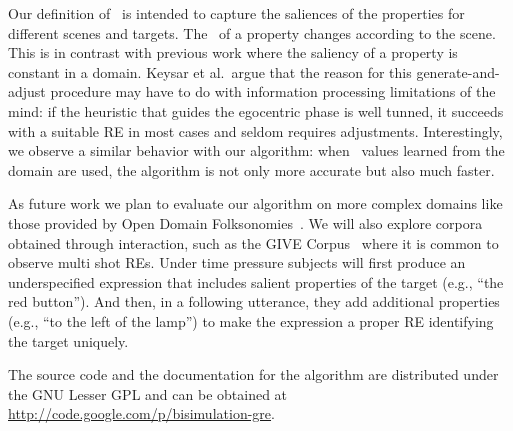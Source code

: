 Our definition of \puse\ is intended to capture the saliences of the properties for different scenes and targets. The \puse\ of a property changes according to the scene. This is in contrast with previous work where the saliency of a property is constant in a domain. Keysar et al.~argue that the reason for this generate-and-adjust procedure may have to do with information processing limitations of the mind: if the heuristic that guides the egocentric phase is well tunned, it succeeds with a suitable RE in most cases and seldom requires adjustments. Interestingly, we observe a similar behavior with our algorithm: when \puse\ values learned from the domain are used, the algorithm is not only more accurate but also much faster. 

As future work we plan to evaluate our algorithm on more complex domains like those provided by Open Domain Folksonomies~\cite{pacheco-duboue-dominguez:2012:NAACL-HLT}. We will also explore corpora obtained through interaction, such as the GIVE Corpus~\cite{GarGarKolStr10} where it is common to observe multi shot REs. Under time pressure subjects will first produce an underspecified expression that includes salient properties of the target (e.g., ``the red button'').  And then, in a following utterance, they add additional properties (e.g., ``to the left of the lamp'') to make the expression a proper RE  identifying the target uniquely.

The source code and the documentation for the algorithm are distributed under the GNU Lesser GPL and can be obtained at \url{http://code.google.com/p/bisimulation-gre}.

